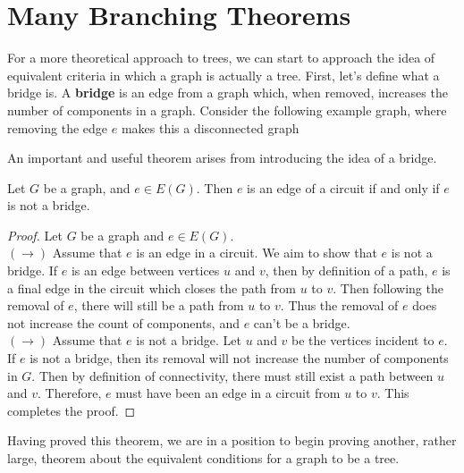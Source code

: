 \section{Many Branching Theorems}
For a more theoretical approach to trees, we can start to approach the idea of equivalent criteria in which a graph is actually a tree. First, let's define what a bridge is. A \textbf{bridge} is an edge from a graph which, when removed, increases the number of components in a graph. Consider the following example graph, where removing the edge $e$ makes this a disconnected graph


An important and useful theorem arises from introducing the idea of a bridge.

\begin{theorem}
Let $G$ be a graph, and $e \in E(G)$. Then $e$ is an edge of a circuit if and only if $e$ is not a bridge.
\end{theorem}
\begin{proof}
Let $G$ be a graph and $e \in E(G)$. \\
$(\rightarrow)$ Assume that $e$ is an edge in a circuit. We aim to show that $e$ is not a bridge. If $e$ is an edge between vertices $u$ and $v$, then by definition of a path, $e$ is a final edge in the circuit which closes the path from $u$ to $v$. Then following the removal of $e$, there will still be a path from $u$ to $v$. Thus the removal of $e$ does not increase the count of components, and $e$ can't be a bridge. \\
$(\rightarrow)$ Assume that $e$ is not a bridge. Let $u$ and $v$ be the vertices incident to $e$. If $e$ is not a bridge, then its removal will not increase the number of components in $G$. Then by definition of connectivity, there must still exist a path between $u$ and $v$. Therefore, $e$ must have been an edge in a circuit from $u$ to $v$. This completes the proof.
\end{proof}

Having proved this theorem, we are in a position to begin proving another, rather large, theorem about the equivalent conditions for a graph to be a tree.

